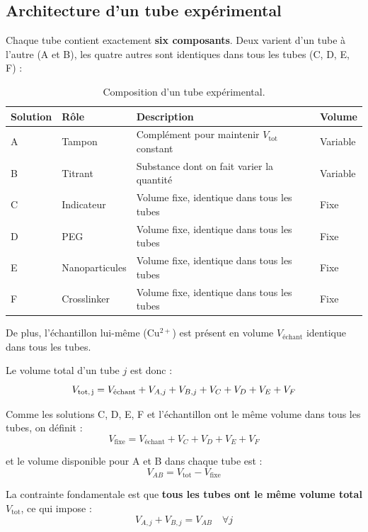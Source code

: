 \documentclass[12pt, a4paper]{article}
\begin{document}
\subsection{Architecture d'un tube expérimental}

Chaque tube contient exactement \textbf{six composants}. Deux varient d'un
tube à l'autre (A et B), les quatre autres sont identiques dans tous les tubes
(C, D, E, F) :

\begin{table}[h!]
  \centering
  \caption{Composition d'un tube expérimental.}
  \label{tab:solutions}
  \begin{tabularx}{\textwidth}{llXl}
    \toprule
    \textbf{Solution} & \textbf{Rôle} & \textbf{Description} & \textbf{Volume} \\
    \midrule
    A & Tampon         & Complément pour maintenir $V_\text{tot}$ constant & Variable \\
    B & Titrant        & Substance dont on fait varier la quantité & Variable \\
    C & Indicateur     & Volume fixe, identique dans tous les tubes & Fixe \\
    D & PEG            & Volume fixe, identique dans tous les tubes & Fixe \\
    E & Nanoparticules & Volume fixe, identique dans tous les tubes & Fixe \\
    F & Crosslinker    & Volume fixe, identique dans tous les tubes & Fixe \\
    \bottomrule
  \end{tabularx}
\end{table}

De plus, l'échantillon lui-même (Cu$^{2+}$) est présent en volume $V_\text{échant}$
identique dans tous les tubes.

\medskip

Le volume total d'un tube $j$ est donc :
\[
V_\text{tot,\,j} = V_\text{échant} + V_{A,j} + V_{B,j}
                   + V_C + V_D + V_E + V_F
\]

Comme les solutions C, D, E, F et l'échantillon ont le même volume dans tous
les tubes, on définit :
\[
V_\text{fixe} = V_\text{échant} + V_C + V_D + V_E + V_F
\]

et le volume disponible pour A et B dans chaque tube est :
\[
V_{AB} = V_\text{tot} - V_\text{fixe}
\]

La contrainte fondamentale est que \textbf{tous les tubes ont le même volume
total} $V_\text{tot}$, ce qui impose :
\[
V_{A,j} + V_{B,j} = V_{AB} \quad \forall j
\]
\end{document}
